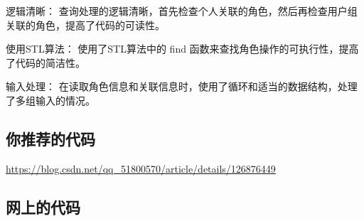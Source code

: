 逻辑清晰： 查询处理的逻辑清晰，首先检查个人关联的角色，然后再检查用户组关联的角色，提高了代码的可读性。

使用STL算法： 使用了STL算法中的 find 函数来查找角色操作的可执行性，提高了代码的简洁性。

输入处理： 在读取角色信息和关联信息时，使用了循环和适当的数据结构，处理了多组输入的情况。

\subsection{你推荐的代码}

\href{202206-3 角色授权}{https://blog.csdn.net/qq\_51800570/article/details/126876449}

\subsection{网上的代码}

